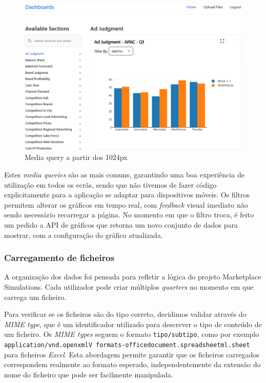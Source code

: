 \begin{figure}[htbp]
    \centering
    \includegraphics[max width=\textwidth]{./img/res_1920}
 \caption{Media query a partir dos 1024px}
 \label{fig:res_1920}
\end{figure}

Estes \textit{media queries} são as mais comuns, garantindo uma boa experiência de utilização em todos os ecrãs, sendo que não tivemos de fazer código explicitamente para a aplicação se adaptar para dispositivos móveis. Os filtros permitem alterar os gráficos em tempo real, com \textit{feedback} visual imediato não sendo necessário recarregar a página. No momento em que o filtro troca, é feito um pedido a API de gráficos que retorna um novo conjunto de dados para mostrar, com a configuração do gráfico atualizada.

\subsubsection{Carregamento de ficheiros}

A organização dos dados foi pensada para refletir a lógica do projeto Marketplace Simulations. Cada utilizador pode criar múltiplos \textit{quarters} no momento em que carrega um ficheiro.

Para verificar se os ficheiros são do tipo correto, decidimos validar através do \textit{MIME type}, que é um identificador  utilizado para descrever o tipo de conteúdo de um ficheiro. Os \textit{MIME types} seguem o formato \texttt{tipo/subtipo}, como por exemplo \texttt{application/\allowbreak vnd\allowbreak.open\allowbreak xmlV formats-\allowbreak officedocument.\allowbreak spreadsheetml.\allowbreak sheet} para ficheiros \textit{Excel}. Esta abordagem permite garantir que os ficheiros carregados correspondem realmente ao formato esperado, independentemente da extensão do nome do ficheiro que pode ser facilmente manipulada. 

